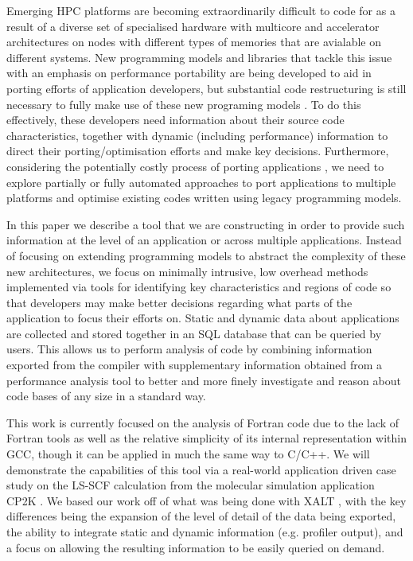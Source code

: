 Emerging HPC platforms are becoming extraordinarily difficult to code for as a result of a diverse set of specialised hardware with multicore and accelerator architectures on nodes with different types of memories that are avialable on different systems.
New programming models and libraries that tackle this issue with an emphasis on performance portability are being developed to aid in porting efforts of application developers, but substantial code restructuring is still necessary to fully make use of these new programing models \cite{anantharaj2013}\cite{titan}.
To do this effectively, these developers need information about their source code characteristics, together with dynamic (including performance) information to direct their porting/optimisation efforts and make key decisions.
Furthermore, considering the potentially costly process of porting applications \cite{larrea2016early}, we need to explore partially or fully automated approaches to port applications to multiple platforms and optimise existing codes written using legacy programming models.

In this paper we describe a tool that we are constructing in order to provide such information at the level of an application or across multiple applications.
Instead of focusing on extending programming models to abstract the complexity of these new architectures, we focus on minimally intrusive, low overhead methods implemented via tools for identifying key characteristics and regions of code so that developers may make better decisions regarding what parts of the application to focus their efforts on.
Static and dynamic data about applications are collected and stored together in an \acs{SQL} database that can be queried by users.
This allows us to perform analysis of code by combining information exported from the compiler with supplementary information obtained from a performance analysis tool to better and more finely investigate and reason about code bases of any size in a standard way.

This work is currently focused on the analysis of Fortran code due to the lack of Fortran tools as well as the relative simplicity of its internal representation within \acs{GCC}, though it can be applied in much the same way to C/C++.
We will demonstrate the capabilities of this tool via a real-world application driven case study on the \ac{LS-SCF} calculation \cite{vandevondele2012linear} from the molecular simulation application CP2K \cite{hutter2014cp2k}.
We based our work off of what was being done with XALT \cite{7081224}, with the key differences being the expansion of the level of detail of the data being exported, the ability to integrate static and dynamic information (e.g. profiler output), and a focus on allowing the resulting information to be easily queried on demand.


